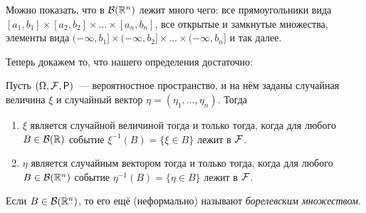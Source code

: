 \begin{remark}
	Можно показать, что в \(\mathcal{B}(\mathbb{R}^n)\) лежит много чего: все прямоугольники вида \([a_1,  b_1] \times [a_2, b_2] \times \dots \times [a_n, b_n]\), все открытые и замкнутые множества, элементы вида \((-\infty,  b_1] \times (-\infty, b_2] \times \dots \times (-\infty, b_n]\) и так далее.
\end{remark}
Теперь докажем то, что нашего определения достаточно:
\begin{lemma}
	Пусть \((\Omega, \F, \Pr)\)~--- вероятностное пространство, и на нём заданы случайная величина \(\xi\) и случайный вектор \(\eta = (\eta_1, \dots, \eta_n)\). Тогда
	\begin{enumerate}
		\item \(\xi\) является случайной величиной тогда и только тогда, когда для любого \(B \in \mathcal{B}(\mathbb{R})\) событие \(\xi^{-1}(B) = \{\xi \in B\}\) лежит в \(\mathcal{F}\).
		\item \(\eta\) является случайным вектором тогда и только тогда, когда 
		для любого \(B \in \mathcal{B}(\mathbb{R}^n)\) событие \(\eta^{-1}(B) = \{\eta \in B\}\) 
		лежит в \(\mathcal{F}\).
	\end{enumerate}
\end{lemma}
\begin{remark}
	Если \(B \in \mathcal{B}(\mathbb{R}^n)\), то его ещё (неформально) называют \emph{борелевским множеством}.
\end{remark}

